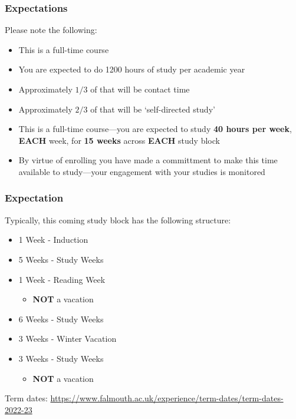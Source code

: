 \begin{frame}
	\frametitle{Expectations}
	
	Please note the following:
	
	\vspace{0.5em}
	
	\begin{itemize}
		\item This is a full-time course
		\item You are expected to do 1200 hours of study per academic year
		\item Approximately $1/3$ of that will be contact time
		\item Approximately $2/3$ of that will be `self-directed study'
		\item This is a full-time course---you are expected to study \textbf{40 hours per week}, \textbf{EACH} week, for \textbf{15 weeks} across \textbf{EACH} study block
		\item By virtue of enrolling you have made a committment to make this time available to study---your engagement with your studies is monitored
	\end{itemize}

\end{frame}

\begin{frame}
	\frametitle{Expectation}
	
	Typically, this coming study block has the following structure:
	
	\begin{itemize}
		\item 1 Week - Induction
		\item 5 Weeks - Study Weeks
		\item 1 Week - Reading Week
		\begin{itemize}
			\item \textbf{NOT} a vacation
		\end{itemize}
		\item 6 Weeks - Study Weeks
		\item 3 Weeks - Winter Vacation
		\item 3 Weeks - Study Weeks
		\begin{itemize}
			\item \textbf{NOT} a vacation
		\end{itemize}
	\end{itemize}
	
	Term dates: \url{https://www.falmouth.ac.uk/experience/term-dates/term-dates-2022-23}
	
\end{frame}

